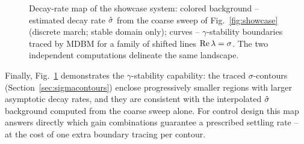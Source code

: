\begin{figure}[tb]
  \centering
  \caption{Decay-rate map of the showcase system: colored background --
  estimated decay rate $\hat{\sigma}$ from the coarse sweep of Fig.~\ref{fig:showcase}
  (discrete march; stable domain only);
  curves -- $\gamma$-stability boundaries traced by MDBM for a
  family of shifted lines $\operatorname{Re}\lambda=\sigma$. The two independent
  computations delineate the same landscape.}\label{fig:sigmacontours}
\end{figure}

Finally, Fig.~\ref{fig:sigmacontours} demonstrates the $\gamma$-stability
capability: the traced $\sigma$-contours (Section~\ref{sec:sigmacontours})
enclose progressively smaller regions with larger asymptotic decay rates, and
they are consistent with the interpolated $\hat{\sigma}$ background computed from
the coarse sweep alone. For control design this map answers directly which
gain combinations guarantee a prescribed settling rate -- at the cost of one
extra boundary tracing per contour.